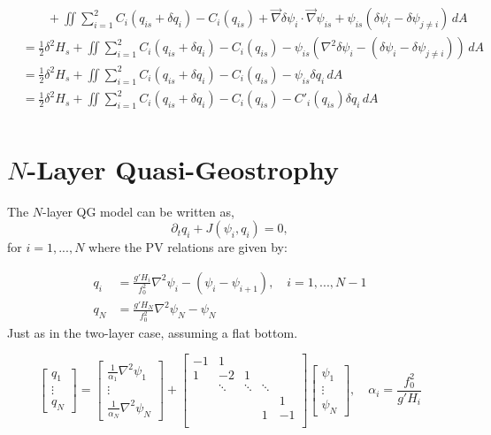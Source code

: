 \documentclass[12pt]{article}
\begin{document}
\begin{align*}
&\quad\quad + \iint \sum_{i=1}^2 C_i(q_{is} + \delta q_i) - C_i(q_{is}) + \vec\nabla\delta\psi_i \cdot \vec\nabla\psi_{is} + \psi_{is}(\delta\psi_i - \delta\psi_{j \ne i}) \, dA \\
&= \frac12 \delta^2 H_s + \iint \sum_{i=1}^2 C_i(q_{is} + \delta q_i) - C_i(q_{is}) - \psi_{is}(\nabla^2\delta\psi_i - (\delta\psi_i - \delta\psi_{j \ne i})) \, dA \\
&= \frac12 \delta^2 H_s + \iint \sum_{i=1}^2 C_i(q_{is} + \delta q_i) - C_i(q_{is}) - \psi_{is}\delta q_i \, dA \\
&= \frac12 \delta^2 H_s + \iint \sum_{i=1}^2 C_i(q_{is} + \delta q_i) - C_i(q_{is}) - C'_i(q_{is})\delta q_i \, dA \\
\end{align*}


\section{$N$-Layer Quasi-Geostrophy}

The $N$-layer QG model can be written as,
$$
\partial_t q_i + J(\psi_i, q_i) = 0,
$$
for $i=1,...,N$ where the PV relations are given by:

\begin{align*}
q_i &= \frac{g'H_i}{f_0^2}\nabla^2 \psi_i - (\psi_i - \psi_{i+1}), \quad i = 1,...,N-1\\
q_N &= \frac{g'H_N}{f_0^2}\nabla^2 \psi_N - \psi_N
\end{align*}
Just as in the two-layer case, assuming a flat bottom.

\begin{equation}
\left[\begin{array}{c}
q_1 \\
\vdots \\
q_N
\end{array}\right]
=
\left[\begin{array}{c}
\frac{1}{\alpha_1}\nabla^2 \psi_1 \\
\vdots \\
\frac{1}{\alpha_N}\nabla^2 \psi_N
\end{array}\right]
+
\left[\begin{array}{ccccc}
-1 & 1 & & & \\
1 & -2 & 1 & & \\
 & \ddots & \ddots & \ddots & \\
 & & & & 1 \\
 & & & 1 & -1\\
\end{array}\right]
\left[\begin{array}{c}
\psi_1 \\
\vdots \\
\psi_N
\end{array}\right],
\quad \alpha_i = \frac{f_0^2}{g'H_i}
\end{equation}
\end{document}
